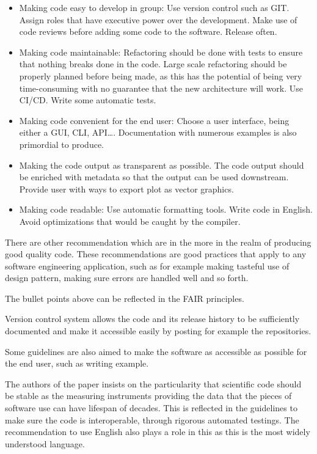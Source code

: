 \documentclass{article}
\begin{document}
\begin{itemize}
    \item Making code easy to develop in group: Use version control such as GIT.  Assign roles that have executive power over the development. Make use of code reviews before adding some code to the software. Release often. 
    \item Making code maintainable: Refactoring should be done with tests to ensure that nothing breaks done in the code. Large scale refactoring should be properly planned before being made, as this has the potential of being very time-consuming with no guarantee that the new architecture will work. Use CI/CD. Write some automatic tests. 
    \item Making code convenient for the end user: Choose a user interface, being either a GUI, CLI, API\dots. Documentation with numerous examples is also primordial to produce.
    \item Making the code output as transparent as possible. The code output should be enriched with metadata so that the output can be used downstream. Provide user with ways to export plot as vector graphics.
    \item Making code readable: Use automatic formatting tools. Write code in English. Avoid optimizations that would be caught by the compiler. 
\end{itemize}

There are other recommendation which are in the more in the realm of producing good quality code. These recommendations are good practices that apply to any software engineering application, such as for example making tasteful use of design pattern, making sure errors are handled well and so forth. 

The bullet points above can be reflected in the FAIR principles. 


Version control system allows the code and its release history to be sufficiently documented and make it accessible easily by posting for example the repositories. 

Some guidelines are also aimed to make the software as accessible as possible for the end user, such as writing example.

The authors of the paper insists on the particularity that scientific code should be stable as the measuring instruments providing the data that the pieces of software use can have lifespan of decades. This is reflected in the guidelines to make sure the code is interoperable, through rigorous automated testings. The recommendation to use English also plays a role in this as this is the most widely understood language. 
\end{document}
